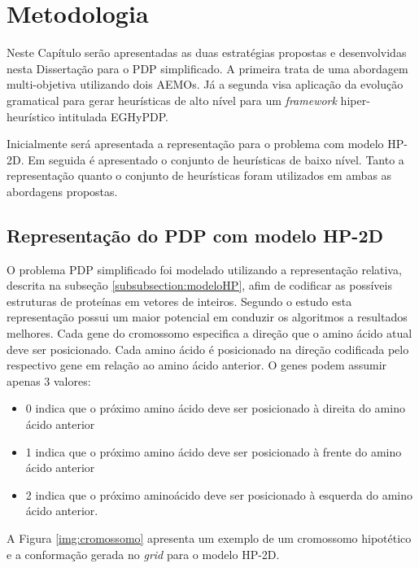 \chapter{Metodologia}
\label{cap:Metodologia}

Neste Capítulo serão apresentadas as duas estratégias propostas e desenvolvidas nesta Dissertação para o PDP simplificado. A primeira trata de uma abordagem multi-objetiva utilizando dois AEMOs. Já a segunda visa aplicação da evolução gramatical  para gerar heurísticas de alto nível para um \textit{framework} hiper-heurístico intitulada EGHyPDP.

Inicialmente será apresentada a representação para o problema com modelo HP-2D. Em seguida é apresentado o conjunto de heurísticas de baixo nível. Tanto a representação quanto o conjunto de heurísticas foram utilizados em ambas as abordagens propostas.

\section{Representação do PDP com modelo HP-2D}

O problema PDP simplificado foi modelado utilizando a representação relativa, descrita na subseção \ref{subsubsection:modeloHP}, afim de codificar as possíveis estruturas de proteínas em vetores de inteiros. Segundo o estudo \cite{krasnogor1999protein} esta representação possui um maior potencial em conduzir os algoritmos a resultados melhores. Cada gene do cromossomo especifica a direção que o amino ácido atual deve ser posicionado. Cada amino ácido é posicionado na direção codificada pelo respectivo gene em relação ao amino ácido anterior. O genes podem assumir apenas 3 valores:

\begin{itemize}
	\item 0 indica que o próximo amino ácido deve ser posicionado à direita do amino ácido anterior
	\item 1 indica que o próximo amino ácido deve ser posicionado à frente do amino ácido anterior
	\item 2 indica que o próximo aminoácido deve ser posicionado à esquerda do amino ácido anterior.
\end{itemize}

A Figura \ref{img:cromossomo} apresenta um exemplo de um cromossomo hipotético e a conformação gerada no \textit{grid} para o modelo HP-2D.


